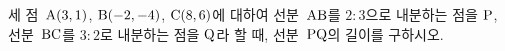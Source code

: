 세 점~$\mathrm{A}(3{,}\mkern3mu\mathopen{}1)$, $\mathrm{B}(-2{,}\mkern3mu\mathopen{}-4)$, $\mathrm{C}(8{,}\mkern3mu\mathopen{}6)$에 대하여 선분~$\mathrm{AB}$를 $2:3$으로 내분하는 점을 $\mathrm{P}$, 선분~$\mathrm{BC}$를 $3:2$로 내분하는 점을 $\mathrm{Q}$라 할 때, 선분~$\mathrm{PQ}$의 길이를 구하시오.
